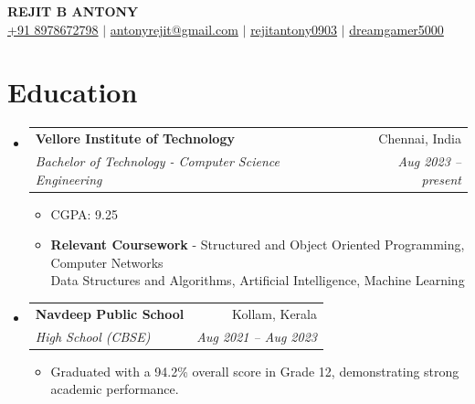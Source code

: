 \documentclass[letterpaper,11pt]{article}
\makeatletter
\newcommand{\resumeItem}[1]{
  \item\small{
    {#1 \vspace{-3pt}}
  }
}
\newcommand{\resumeSubheading}[4]{
  \vspace{-2pt}\item
    \begin{tabular*}{0.97\textwidth}[t]{l@{\extracolsep{\fill}}r}
      \textbf{#1} & #2 \\
      \textit{\small#3} & \textit{\small #4} \\
    \end{tabular*}\vspace{-7pt}
}
\newcommand{\resumeSubHeadingListStart}{\begin{itemize}[leftmargin=0.15in, label={}]}
\newcommand{\resumeSubHeadingListEnd}{\end{itemize}}
\newcommand{\resumeItemListStart}{\begin{itemize}}
\newcommand{\resumeItemListEnd}{\end{itemize}\vspace{-5pt}}
\makeatother
\begin{document}
\begin{center}
    \textbf{\Huge \scshape REJIT B ANTONY} \\ \vspace{8pt}
    \small
    \href{callto:antonyrejit@gmail.com:}{{+91 8978672798}} $ |  $
    \href{mailto:antonyrejit@gmail.com:}{{antonyrejit@gmail.com}} $ |  $
    \href{https://www.linkedin.com/in/rejitantony0903}{{rejitantony0903}} $  | $
    \href{https://github.com/dreamgamer5000}
    {{dreamgamer5000}}
\end{center}

\centering


\section{Education}
  \resumeSubHeadingListStart
    \resumeSubheading
      {Vellore Institute of Technology}{Chennai, India}
      {Bachelor of Technology - Computer Science Engineering}{Aug 2023 -- present}
      \resumeItemListStart
        \resumeItem{CGPA: 9.25}
       
        \resumeItem{\textbf{Relevant Coursework} - Structured and Object Oriented Programming, Computer Networks\\
          Data Structures and Algorithms,
         Artificial Intelligence, Machine Learning \\

         
} 
        
      \resumeItemListEnd 
      
      \vspace{8pt}
      
    \resumeSubheading
      {Navdeep Public School}{Kollam, Kerala}
      {High School (CBSE)}{Aug 2021 -- Aug 2023}
      \resumeItemListStart
        \resumeItem{Graduated with a 94.2\% overall score in Grade 12, demonstrating strong academic performance.}
      \resumeItemListEnd\vspace{4pt}
    
    
  \resumeSubHeadingListEnd
\end{document}

